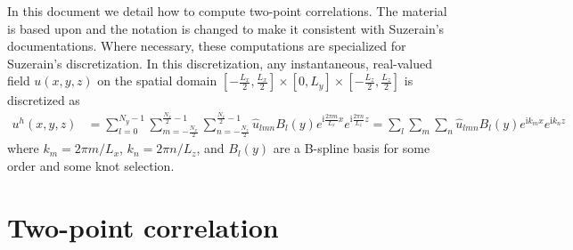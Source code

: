 \documentclass[letterpaper,11pt,nointlimits,reqno]{amsart}
\newcommand{\ii}{\ensuremath{\mathrm{i}}}
\begin{document}
In this document we detail how to compute two-point correlations.  The material
is based upon \citet[\textsection{}6.4--5]{Pope2000Turbulent} and the notation
is changed to make it consistent with Suzerain's documentations.  Where
necessary, these computations are specialized for Suzerain's discretization.  In
this discretization, any instantaneous, real-valued field
$u\!\left(x,y,z\right)$ on the spatial domain
$\left[-\frac{L_x}{2},\frac{L_x}{2}\right] \times{} [0,L_y] \times{}
\left[-\frac{L_z}{2},\frac{L_z}{2}\right]$ is discretized as
\begin{align}
  u^h(x,y,z)
&=
  \sum_{l=0}^{N_y - 1}
  \sum_{m=-\frac{N_x}{2}}^{\frac{N_x}{2}-1}
  \sum_{n=-\frac{N_z}{2}}^{\frac{N_z}{2}-1}
  \hat{u}_{l m n}
  B_l\!\left(y\right)
  e^{\ii\frac{2\pi{}m}{L_x}x}
  e^{\ii\frac{2\pi{}n}{L_z}z}
=
  \sum_{l}\sum_{m}\sum_{n}
  \hat{u}_{l m n}B_l\!\left(y\right)e^{\ii k_m x}e^{\ii k_n z}
\end{align}
where $k_m = 2\pi{}m/L_x$, $k_n = 2\pi{}n/L_z$, and $B_l\!\left(y\right)$ are a
B-spline basis for some order and some knot selection.

\section{Two-point correlation
         \citep[\textsection{}6.3]{Pope2000Turbulent}}
\end{document}
